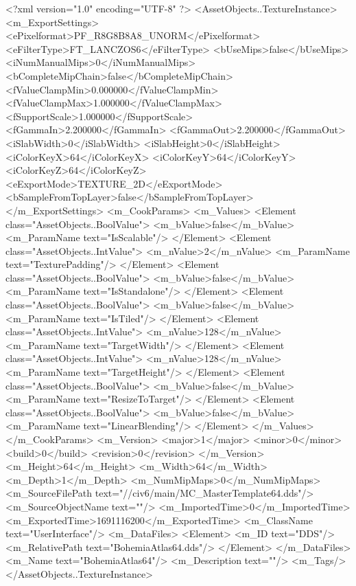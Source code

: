 <?xml version="1.0" encoding="UTF-8" ?>
<AssetObjects..TextureInstance>
	<m_ExportSettings>
		<ePixelformat>PF_R8G8B8A8_UNORM</ePixelformat>
		<eFilterType>FT_LANCZOS6</eFilterType>
		<bUseMips>false</bUseMips>
		<iNumManualMips>0</iNumManualMips>
		<bCompleteMipChain>false</bCompleteMipChain>
		<fValueClampMin>0.000000</fValueClampMin>
		<fValueClampMax>1.000000</fValueClampMax>
		<fSupportScale>1.000000</fSupportScale>
		<fGammaIn>2.200000</fGammaIn>
		<fGammaOut>2.200000</fGammaOut>
		<iSlabWidth>0</iSlabWidth>
		<iSlabHeight>0</iSlabHeight>
		<iColorKeyX>64</iColorKeyX>
		<iColorKeyY>64</iColorKeyY>
		<iColorKeyZ>64</iColorKeyZ>
		<eExportMode>TEXTURE_2D</eExportMode>
		<bSampleFromTopLayer>false</bSampleFromTopLayer>
	</m_ExportSettings>
	<m_CookParams>
		<m_Values>
			<Element class="AssetObjects..BoolValue">
				<m_bValue>false</m_bValue>
				<m_ParamName text="IsScalable"/>
			</Element>
			<Element class="AssetObjects..IntValue">
				<m_nValue>2</m_nValue>
				<m_ParamName text="TexturePadding"/>
			</Element>
			<Element class="AssetObjects..BoolValue">
				<m_bValue>false</m_bValue>
				<m_ParamName text="IsStandalone"/>
			</Element>
			<Element class="AssetObjects..BoolValue">
				<m_bValue>false</m_bValue>
				<m_ParamName text="IsTiled"/>
			</Element>
			<Element class="AssetObjects..IntValue">
				<m_nValue>128</m_nValue>
				<m_ParamName text="TargetWidth"/>
			</Element>
			<Element class="AssetObjects..IntValue">
				<m_nValue>128</m_nValue>
				<m_ParamName text="TargetHeight"/>
			</Element>
			<Element class="AssetObjects..BoolValue">
				<m_bValue>false</m_bValue>
				<m_ParamName text="ResizeToTarget"/>
			</Element>
			<Element class="AssetObjects..BoolValue">
				<m_bValue>false</m_bValue>
				<m_ParamName text="LinearBlending"/>
			</Element>
		</m_Values>
	</m_CookParams>
	<m_Version>
		<major>1</major>
		<minor>0</minor>
		<build>0</build>
		<revision>0</revision>
	</m_Version>
	<m_Height>64</m_Height>
	<m_Width>64</m_Width>
	<m_Depth>1</m_Depth>
	<m_NumMipMaps>0</m_NumMipMaps>
	<m_SourceFilePath text="//civ6/main/MC_MasterTemplate\Textures\BohemiaAtlas64.dds"/>
	<m_SourceObjectName text=""/>
	<m_ImportedTime>0</m_ImportedTime>
	<m_ExportedTime>1691116200</m_ExportedTime>
	<m_ClassName text="UserInterface"/>
	<m_DataFiles>
		<Element>
			<m_ID text="DDS"/>
			<m_RelativePath text="BohemiaAtlas64.dds"/>
		</Element>
	</m_DataFiles>
	<m_Name text="BohemiaAtlas64"/>
	<m_Description text=""/>
	<m_Tags/>
</AssetObjects..TextureInstance>

